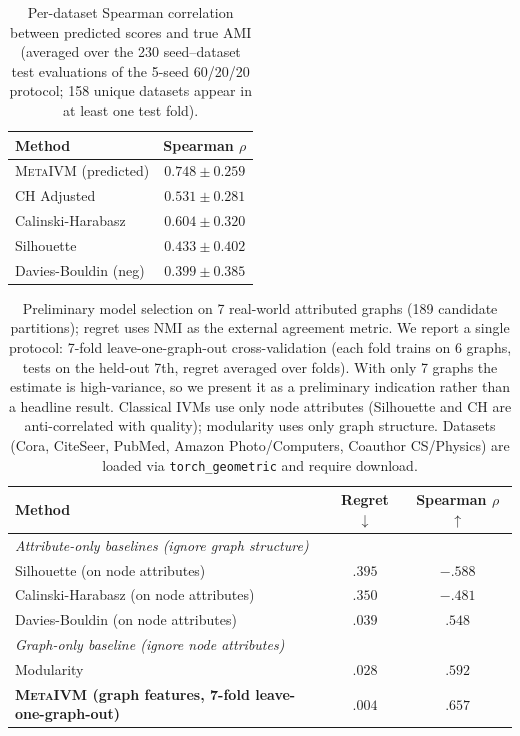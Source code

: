 \documentclass[10pt]{article} %
\newcommand{\ours}{\textsc{MetaIVM}}
\begin{document}
\begin{table}[h]
\centering
\caption{Per-dataset Spearman correlation between predicted scores and true AMI (averaged over the 230 seed--dataset test evaluations of the 5-seed 60/20/20 protocol; 158 unique datasets appear in at least one test fold).}
\label{tab:correlation}
\small
\begin{tabular}{lc}
\toprule
\textbf{Method} & \textbf{Spearman} $\rho$ \\
\midrule
\ours{} (predicted) & $\mathbf{0.748 \pm 0.259}$ \\
CH Adjusted \citep{jeon2025measuring} & $0.531 \pm 0.281$ \\
Calinski-Harabasz & $0.604 \pm 0.320$ \\
Silhouette & $0.433 \pm 0.402$ \\
Davies-Bouldin (neg) & $0.399 \pm 0.385$ \\
\bottomrule
\end{tabular}
\end{table}

\begin{table}[h]
\centering
\caption{Preliminary model selection on 7 real-world attributed graphs (189 candidate partitions); regret uses NMI as the external agreement metric. We report a single protocol: 7-fold leave-one-graph-out cross-validation (each fold trains on 6 graphs, tests on the held-out 7th, regret averaged over folds). With only 7 graphs the estimate is high-variance, so we present it as a preliminary indication rather than a headline result. Classical IVMs use only node attributes (Silhouette and CH are anti-correlated with quality); modularity uses only graph structure. Datasets (Cora, CiteSeer, PubMed, Amazon Photo/Computers, Coauthor CS/Physics) are loaded via \texttt{torch\_geometric} and require download.}
\label{tab:attr_graph}
\small
\begin{tabular}{lcc}
\toprule
\textbf{Method} & \textbf{Regret} $\downarrow$ & \textbf{Spearman} $\rho$ $\uparrow$ \\
\midrule
\multicolumn{3}{l}{\textit{Attribute-only baselines (ignore graph structure)}} \\
Silhouette (on node attributes) & $.395$ & $-.588$ \\
Calinski-Harabasz (on node attributes) & $.350$ & $-.481$ \\
Davies-Bouldin (on node attributes) & $.039$ & $.548$ \\
\midrule
\multicolumn{3}{l}{\textit{Graph-only baseline (ignore node attributes)}} \\
Modularity & $.028$ & $.592$ \\
\midrule
\textbf{\ours{} (graph features, 7-fold leave-one-graph-out)} & $\mathbf{.004}$ & $\mathbf{.657}$ \\
\bottomrule
\end{tabular}
\end{table}
\end{document}
